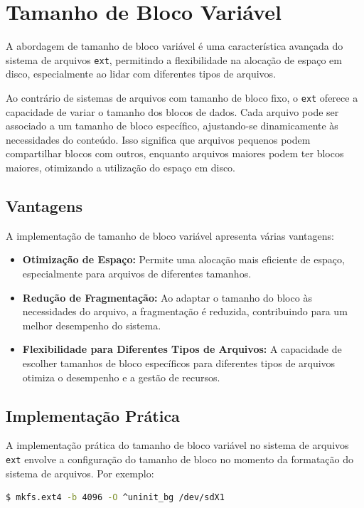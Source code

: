 \documentclass[
	12pt,				%
	openright,			%
	oneside,			%
	a4paper,			%
	chapter=TITLE,		%
	english,			%
	french,				%
	spanish,			%
	brazil				%
	]{abntex2}
\theoremstyle{definition}
\begin{document}
\section{Tamanho de Bloco Variável}
A abordagem de tamanho de bloco variável é uma característica avançada do sistema de arquivos \texttt{ext}, permitindo a flexibilidade na alocação de espaço em disco, especialmente ao lidar com diferentes tipos de arquivos.

Ao contrário de sistemas de arquivos com tamanho de bloco fixo, o \texttt{ext} oferece a capacidade de variar o tamanho dos blocos de dados. Cada arquivo pode ser associado a um tamanho de bloco específico, ajustando-se dinamicamente às necessidades do conteúdo. Isso significa que arquivos pequenos podem compartilhar blocos com outros, enquanto arquivos maiores podem ter blocos maiores, otimizando a utilização do espaço em disco.

\subsection{Vantagens}
A implementação de tamanho de bloco variável apresenta várias vantagens:

\begin{itemize}
    \item \textbf{Otimização de Espaço:} Permite uma alocação mais eficiente de espaço, especialmente para arquivos de diferentes tamanhos.
    
    \item \textbf{Redução de Fragmentação:} Ao adaptar o tamanho do bloco às necessidades do arquivo, a fragmentação é reduzida, contribuindo para um melhor desempenho do sistema.
    
    \item \textbf{Flexibilidade para Diferentes Tipos de Arquivos:} A capacidade de escolher tamanhos de bloco específicos para diferentes tipos de arquivos otimiza o desempenho e a gestão de recursos.
\end{itemize}

\subsection{Implementação Prática}
A implementação prática do tamanho de bloco variável no sistema de arquivos \texttt{ext} envolve a configuração do tamanho de bloco no momento da formatação do sistema de arquivos. Por exemplo:

\begin{lstlisting}[language=bash, caption={Exemplo de Tamanho de Bloco Variável}]
$ mkfs.ext4 -b 4096 -O ^uninit_bg /dev/sdX1
\end{lstlisting}
\end{document}
